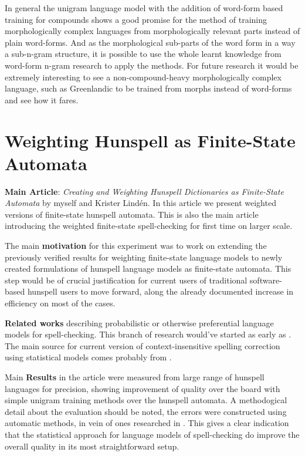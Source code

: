 \documentclass[officiallayout]{unihelcompling}
\begin{document}
In general the unigram language model with the addition of word-form based
training for compounds shows a good promise for the method of training
morphologically complex languages from morphologically relevant parts instead
of plain word-forms. And as the morphological sub-parts of the word form in
a way a sub-n-gram structure, it is possible to use the whole learnt knowledge
from word-form n-gram research to apply the methods. For future research it
would be extremely interesting to see a non-compound-heavy morphologically
complex language, such as Greenlandic to be trained from morphs instead of
word-forms and see how it fares.

\section{Weighting Hunspell as Finite-State Automata}

\textbf{Main Article}: \emph{Creating and Weighting Hunspell Dictionaries as Finite-State Automata} by myself and Krister Lindén. In this article we present
weighted versions of finite-state hunspell automata. This is also the main
article introducing the weighted finite-state spell-checking for first time
on larger scale.

The main \textbf{motivation} for this experiment was to work on extending the
previously verified results for weighting finite-state language models to
newly created formulations of hunspell language models as finite-state
automata. This step would be of crucial justification for current users of
traditional software-based hunspell users to move forward, along the already
documented increase in efficiency on most of the cases. 

\textbf{Related works} describing probabilistic or otherwise preferential
language models for spell-checking. This branch of research would've started
as early as \citep{}. The main source for current version of 
context-insensitive spelling correction using statistical models comes
probably from \citep{church1991probability}.

Main \textbf{Results} in the article were measured from large range of hunspell
languages for precision, showing improvement of quality over the board with
simple unigram training methods over the hunspell automata. A methodogical
detail about the evaluation should be noted, the errors were constructed using
automatic methods, in vein of ones researched in
\citep{bigert2003autoeval,bigert2005automatic}. This gives a clear indication
that the statistical approach for language models of spell-checking do improve
the overall quality in its most straightforward setup.
\end{document}

